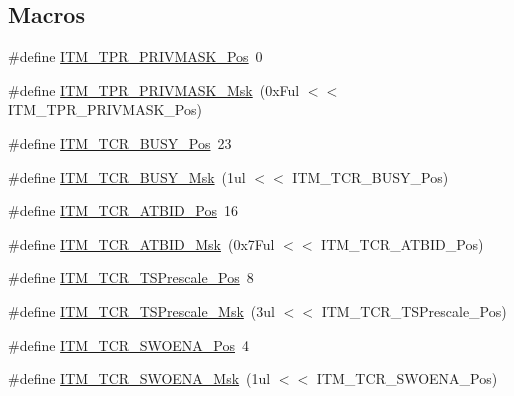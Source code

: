 \subsection*{Macros}
\begin{DoxyCompactItemize}
\item 
\#define \hyperlink{group___c_m_s_i_s___c_m3___i_t_m_ga7abe5e590d1611599df87a1884a352e8}{I\-T\-M\-\_\-\-T\-P\-R\-\_\-\-P\-R\-I\-V\-M\-A\-S\-K\-\_\-\-Pos}~0
\item 
\#define \hyperlink{group___c_m_s_i_s___c_m3___i_t_m_ga168e089d882df325a387aab3a802a46b}{I\-T\-M\-\_\-\-T\-P\-R\-\_\-\-P\-R\-I\-V\-M\-A\-S\-K\-\_\-\-Msk}~(0x\-Ful $<$$<$ I\-T\-M\-\_\-\-T\-P\-R\-\_\-\-P\-R\-I\-V\-M\-A\-S\-K\-\_\-\-Pos)
\item 
\#define \hyperlink{group___c_m_s_i_s___c_m3___i_t_m_ga9174ad4a36052c377cef4e6aba2ed484}{I\-T\-M\-\_\-\-T\-C\-R\-\_\-\-B\-U\-S\-Y\-\_\-\-Pos}~23
\item 
\#define \hyperlink{group___c_m_s_i_s___c_m3___i_t_m_ga43ad7cf33de12f2ef3a412d4f354c60f}{I\-T\-M\-\_\-\-T\-C\-R\-\_\-\-B\-U\-S\-Y\-\_\-\-Msk}~(1ul $<$$<$ I\-T\-M\-\_\-\-T\-C\-R\-\_\-\-B\-U\-S\-Y\-\_\-\-Pos)
\item 
\#define \hyperlink{group___c_m_s_i_s___c_m3___i_t_m_gad5a179af7ad1f2b8958e50907186529b}{I\-T\-M\-\_\-\-T\-C\-R\-\_\-\-A\-T\-B\-I\-D\-\_\-\-Pos}~16
\item 
\#define \hyperlink{group___c_m_s_i_s___c_m3___i_t_m_ga491d8bddbe6c0523ff10ef6d2846f0f2}{I\-T\-M\-\_\-\-T\-C\-R\-\_\-\-A\-T\-B\-I\-D\-\_\-\-Msk}~(0x7\-Ful $<$$<$ I\-T\-M\-\_\-\-T\-C\-R\-\_\-\-A\-T\-B\-I\-D\-\_\-\-Pos)
\item 
\#define \hyperlink{group___c_m_s_i_s___c_m3___i_t_m_gad7bc9ee1732032c6e0de035f0978e473}{I\-T\-M\-\_\-\-T\-C\-R\-\_\-\-T\-S\-Prescale\-\_\-\-Pos}~8
\item 
\#define \hyperlink{group___c_m_s_i_s___c_m3___i_t_m_ga7a723f71bfb0204c264d8dbe8cc7ae52}{I\-T\-M\-\_\-\-T\-C\-R\-\_\-\-T\-S\-Prescale\-\_\-\-Msk}~(3ul $<$$<$ I\-T\-M\-\_\-\-T\-C\-R\-\_\-\-T\-S\-Prescale\-\_\-\-Pos)
\item 
\#define \hyperlink{group___c_m_s_i_s___c_m3___i_t_m_ga7a380f0c8078f6560051406583ecd6a5}{I\-T\-M\-\_\-\-T\-C\-R\-\_\-\-S\-W\-O\-E\-N\-A\-\_\-\-Pos}~4
\item 
\#define \hyperlink{group___c_m_s_i_s___c_m3___i_t_m_ga97476cb65bab16a328b35f81fd02010a}{I\-T\-M\-\_\-\-T\-C\-R\-\_\-\-S\-W\-O\-E\-N\-A\-\_\-\-Msk}~(1ul $<$$<$ I\-T\-M\-\_\-\-T\-C\-R\-\_\-\-S\-W\-O\-E\-N\-A\-\_\-\-Pos)
\item 
$$
\end{DoxyCompactItemize}

